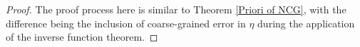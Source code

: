 \begin{proof}
	
	The proof process here is similar to Theorem \ref{Priori of NCG}, with the difference being the inclusion of coarse-grained error in $\eta$ during the application of the inverse function theorem.
	
	
	
	
	
	
	

\end{proof}
